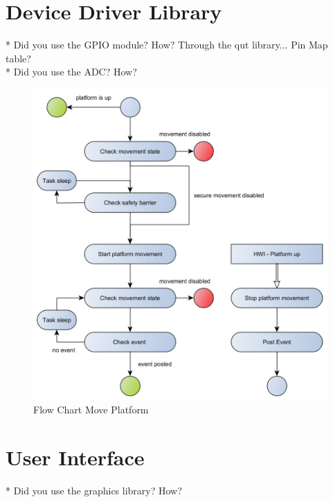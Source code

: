 \section{Device Driver Library} %
* Did you use the GPIO module? How? Through the qut library... Pin Map table?\\
* Did you use the ADC? How? 


\begin{figure}[H]
	\begin{center}
		\includegraphics[scale=.40]{media/Flow_Chart_MovePlatform.png} 	
		\caption{Flow Chart Move Platform}
		\label{fig:moveplatform}
	\end{center}
\end{figure}

\section{User Interface} %
* Did you use the graphics library? How?\\



